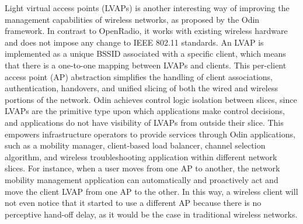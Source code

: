 Light virtual access points (LVAPs) is another interesting way of improving the management capabilities of 
wireless networks, as proposed by the Odin~\cite{schulz-zander2014-atc} framework. 
In contrast to OpenRadio, 
it works with existing wireless hardware and does not impose any change to IEEE 802.11 standards. An LVAP is implemented as a unique BSSID associated with a specific client, which means that there is a one-to-one mapping between LVAPs and clients. This per-client access point (AP) abstraction simplifies the handling of client associations, authentication, handovers, and unified slicing of both the wired and wireless portions of the network. Odin achieves control logic isolation between slices, since LVAPs are the primitive type upon which applications make control decisions, and applications do not have visibility of LVAPs from outside their slice.
 This empowers infrastructure operators to provide services through Odin applications, such as a mobility manager, client-based load balancer, channel selection algorithm, and wireless troubleshooting application within different network slices. For instance, when a user moves from one AP to another, the
 network mobility management application can automatically and proactively act and move the client LVAP from one
AP to the other. In this way, a wireless client will not even notice that it started to use a different AP
because there is no perceptive hand-off delay, as it would be the case in traditional wireless networks.


